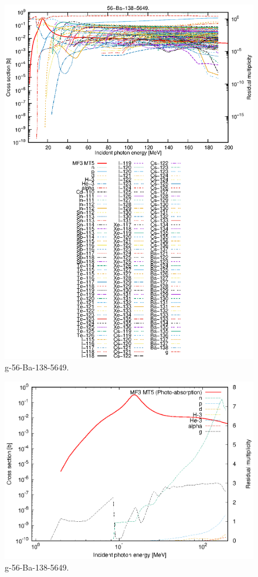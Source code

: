 \begin{figure}
 \includegraphics[width=\linewidth]{eps/g_56-Ba-138_5649.eps}
  \caption{g-56-Ba-138-5649.}
\end{figure}
\newpage \clearpage

\begin{figure}
 \includegraphics[width=\linewidth]{eps-log/g_56-Ba-138_5649.eps}
 \caption{g-56-Ba-138-5649.}
\end{figure}
\newpage \clearpage

